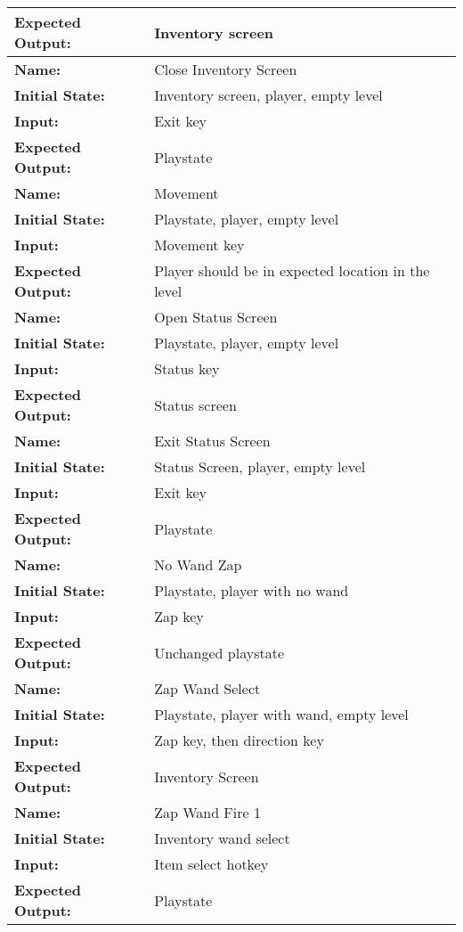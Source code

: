 \documentclass[12pt, titlepage]{article}
\begin{document}
\begin{center}
\begin{longtable}{ l | p{10cm} }
				\textbf{Expected Output:} & Inventory screen\\
				\hline
				\textbf{Name:} & Close Inventory Screen\\
				\textbf{Initial State:} & Inventory screen, player, empty level\\
				\textbf{Input:} & Exit key\\
				\textbf{Expected Output:} & Playstate\\
				\hline
				\textbf{Name:} & Movement\\
				\textbf{Initial State:} & Playstate, player, empty level\\
				\textbf{Input:} & Movement key\\
				\textbf{Expected Output:} & Player should be in expected location in the level\\
				\hline
				\textbf{Name:} & Open Status Screen\\
				\textbf{Initial State:} & Playstate, player, empty level\\
				\textbf{Input:} & Status key\\
				\textbf{Expected Output:} & Status screen\\
				\hline
				\textbf{Name:} & Exit Status Screen\\
				\textbf{Initial State:} & Status Screen, player, empty level\\
				\textbf{Input:} & Exit key\\
				\textbf{Expected Output:} & Playstate\\
				\hline
				\textbf{Name:} & No Wand Zap\\
				\textbf{Initial State:} & Playstate, player with no wand\\
				\textbf{Input:} & Zap key\\
				\textbf{Expected Output:} & Unchanged playstate\\
				\hline
				\textbf{Name:} & Zap Wand Select\\
				\textbf{Initial State:} & Playstate, player with wand, empty level \\
				\textbf{Input:} & Zap key, then direction key\\
				\textbf{Expected Output:} & Inventory Screen\\
				\hline
				\textbf{Name:} & Zap Wand Fire 1\\
				\textbf{Initial State:} & Inventory wand select\\
				\textbf{Input:} & Item select hotkey\\
				\textbf{Expected Output:} & Playstate\\

\end{longtable}
\end{center}
\end{document}
